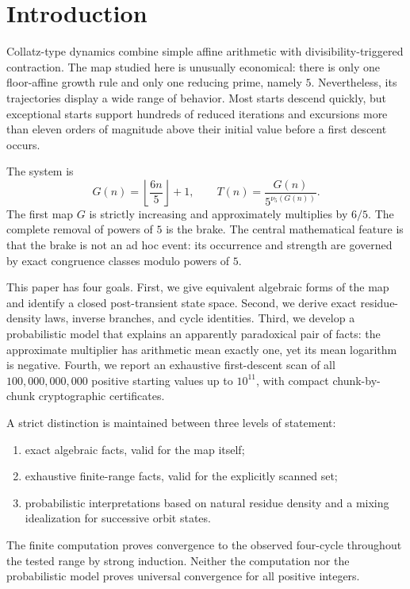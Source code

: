 \documentclass[11pt]{article}
\theoremstyle{definition}
\newcommand{\nuFive}{\nu_5}
\newcommand{\Nscan}{100{,}000{,}000{,}000}
\begin{document}
\tableofcontents

\section{Introduction}

Collatz-type dynamics combine simple affine arithmetic with divisibility-triggered contraction. The map studied here is unusually economical: there is only one floor-affine growth rule and only one reducing prime, namely $5$. Nevertheless, its trajectories display a wide range of behavior. Most starts descend quickly, but exceptional starts support hundreds of reduced iterations and excursions more than eleven orders of magnitude above their initial value before a first descent occurs.

The system is
\begin{equation}
G(n)=\left\lfloor\frac{6n}{5}\right\rfloor+1,\qquad
T(n)=\frac{G(n)}{5^{\nuFive(G(n))}}.
\label{eq:def}
\end{equation}
The first map $G$ is strictly increasing and approximately multiplies by $6/5$. The complete removal of powers of $5$ is the brake. The central mathematical feature is that the brake is not an ad hoc event: its occurrence and strength are governed by exact congruence classes modulo powers of $5$.

This paper has four goals. First, we give equivalent algebraic forms of the map and identify a closed post-transient state space. Second, we derive exact residue-density laws, inverse branches, and cycle identities. Third, we develop a probabilistic model that explains an apparently paradoxical pair of facts: the approximate multiplier has arithmetic mean exactly one, yet its mean logarithm is negative. Fourth, we report an exhaustive first-descent scan of all $\Nscan$ positive starting values up to $10^{11}$, with compact chunk-by-chunk cryptographic certificates.

A strict distinction is maintained between three levels of statement:
\begin{enumerate}[label=(\roman*)]
\item exact algebraic facts, valid for the map itself;
\item exhaustive finite-range facts, valid for the explicitly scanned set;
\item probabilistic interpretations based on natural residue density and a mixing idealization for successive orbit states.
\end{enumerate}
The finite computation proves convergence to the observed four-cycle throughout the tested range by strong induction. Neither the computation nor the probabilistic model proves universal convergence for all positive integers.
\end{document}
